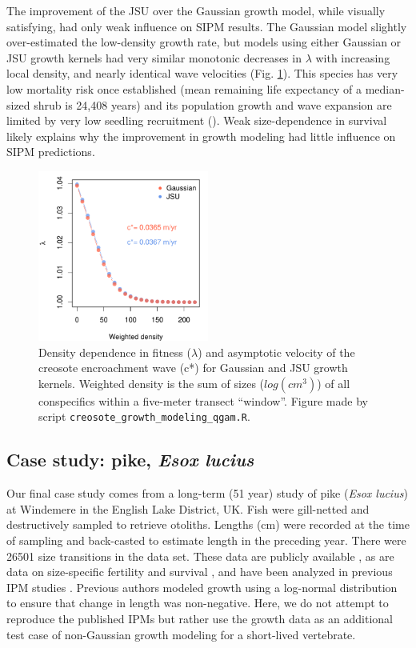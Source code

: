 \documentclass[12pt]{article}
\begin{document}
The improvement of the JSU over the Gaussian growth model, while visually satisfying, had only weak influence on SIPM results. 
The Gaussian model slightly over-estimated the low-density growth rate, but models using either Gaussian or JSU growth kernels had very similar monotonic decreases in $\lambda$ with increasing local density, and nearly identical wave velocities (Fig. \ref{fig:creosote_lambda_cstar}). 
This species has very low mortality risk once established (mean remaining life expectancy of a median-sized shrub is 24,408 years) and its population growth and wave expansion are limited by very low seedling recruitment (\citep{drees2023demography}). 
Weak size-dependence in survival likely explains why the improvement in growth modeling had little influence on SIPM predictions. 

\begin{figure}[tbp]
	\centering
	\includegraphics[width=0.5\textwidth]{figures/creosote_DD_lambda.pdf}
	\caption{Density dependence in fitness ($\lambda$) and asymptotic velocity of the creosote encroachment wave (c*) for Gaussian and JSU growth kernels. Weighted density is the sum of sizes ($log(cm^3)$) of all conspecifics within a five-meter transect ``window''. Figure made by script \texttt{creosote\_growth\_modeling\_qgam.R}.}
	\label{fig:creosote_lambda_cstar}
\end{figure}

\subsection{Case study: pike, \emph{Esox lucius}}
\label{sec:pike}
Our final case study comes from a long-term (51 year) study of pike (\emph{Esox lucius}) at Windemere in the English Lake District, UK. 
Fish were gill-netted and destructively sampled to retrieve otoliths. 
Lengths (cm) were recorded at the time of sampling and back-casted to estimate length in the preceding year. 
There were 26501 size transitions in the data set. 
These data are publicly available \citep{winfield2013pikegrowth}, as are data on size-specific fertility and survival \citep{winfield2013pikesurvival,winfield2013pikefecundity}, and have been analyzed in previous IPM studies \citep{vindenes2014effects,stubberud2019effects}. 
Previous authors modeled growth using a log-normal distribution to ensure that change in length was non-negative. 
Here, we do not attempt to reproduce the published IPMs but rather use the growth data as an additional test case of non-Gaussian growth modeling for a short-lived vertebrate. 
\end{document}
